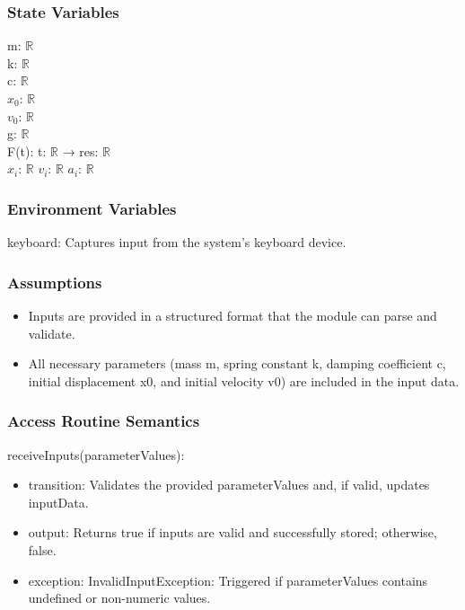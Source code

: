 \documentclass[12pt, titlepage]{article}
\begin{document}
\subsubsection{State Variables}
m: $\mathbb{R}$\\
k: $\mathbb{R}$\\
c: $\mathbb{R}$\\
$x_0$: $\mathbb{R}$\\
$v_0$: $\mathbb{R}$\\
g: $\mathbb{R}$\\
F(t): t: $\mathbb{R}$ → res: $\mathbb{R}$\\ %
$x_i$: $\mathbb{R}$
$v_i$: $\mathbb{R}$
$a_i$: $\mathbb{R}$

\subsubsection{Environment Variables}

keyboard: Captures input from the system's keyboard device.

\subsubsection{Assumptions}

\begin{itemize}
  \item Inputs are provided in a structured format that the module can parse and validate.
  \item All necessary parameters (mass m, spring constant k, damping coefficient c, initial displacement x0, and initial velocity v0) are included in the input data.
\end{itemize}

\subsubsection{Access Routine Semantics}

\noindent receiveInputs(parameterValues):
\begin{itemize}
\item transition: Validates the provided parameterValues and, if valid, updates inputData.
\item output: Returns true if inputs are valid and successfully stored; otherwise, false.
\item exception: InvalidInputException: Triggered if parameterValues contains undefined or non-numeric values.
\end{itemize}
\end{document}
